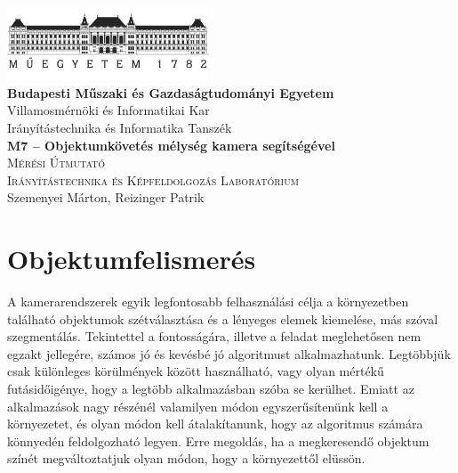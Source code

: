 \documentclass[12pt,a4paper,oneside]{report}             %
\author{\vikauthor}
\title{\viktitle}
\newcommand{\vikauthor}{Szemenyei Márton, Reizinger Patrik}
\newcommand{\viktitle}{M7 – Objektumkövetés mélység kamera segítségével}
\newcommand{\vikdept}{Irányítástechnika és Informatika Tanszék}
\newcommand{\vikdoktipus}{Irányítástechnika és Képfeldolgozás Laboratórium}
\newcommand{\viksubtitle}{Mérési Útmutató}
\newcommand{\hsp}{\hspace{20pt}}
\begin{document}
\onehalfspacing

\begin{titlepage}
\begin{center}
\includegraphics[width=60mm,keepaspectratio]{images/logo.png}\\
\vspace{0.3cm}
\textbf{Budapesti Műszaki és Gazdaságtudományi Egyetem}\\
\textmd{Villamosmérnöki és Informatikai Kar}\\
\textmd{\vikdept}\\[5cm]

\vspace{0.4cm}
{\huge \bfseries \viktitle}\\[2cm]
\textsc{\Large \viksubtitle}\\[1cm]
\textsc{\Large \vikdoktipus}\\[6cm]

\vfill
{\large \vikauthor}
\end{center}
\end{titlepage}


\singlespacing
\tableofcontents\thispagestyle{fancy}
\titleformat{\chapter}[hang]{\Huge\bfseries}{\thechapter\hsp}{0pt}{\Huge\bfseries}

\chapter{Objektumfelismerés}

A kamerarendszerek egyik legfontosabb felhasználási célja a környezetben található objektumok szétválasztása és a lényeges elemek kiemelése, más szóval szegmentálás. Tekintettel a fontosságára, illetve a feladat meglehetősen nem egzakt jellegére, számos jó és kevésbé jó algoritmust alkalmazhatunk. Legtöbbjük csak különleges körülmények között használható, vagy olyan mértékű futásidőigénye, hogy a legtöbb alkalmazásban szóba se kerülhet. Emiatt az alkalmazások nagy részénél valamilyen módon egyszerűsítenünk kell a környezetet, és olyan módon kell átalakítanunk, hogy az algoritmus számára könnyedén feldolgozható legyen. Erre megoldás, ha a megkeresendő objektum színét megváltoztatjuk olyan módon, hogy a környezettől elüssön.
\end{document}
